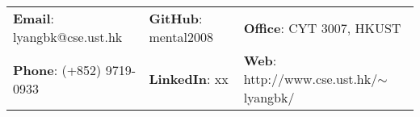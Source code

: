 
\vspace{0.5cm} 
\begin{center}
\begin{tabular}{lll}
\textbf{Email}: lyangbk@cse.ust.hk &
\hspace{0.35in} \textbf{GitHub}: mental2008 &
\hspace{0.2in}  \textbf{Office}: CYT 3007, HKUST \\

\textbf{Phone}: (+852) 9719-0933   & 
\hspace{0.35in} \textbf{LinkedIn}: xx   & 
\hspace{0.2in} \textbf{Web}: http://www.cse.ust.hk/$\sim$lyangbk/ \\ 
\end{tabular}
\end{center}
